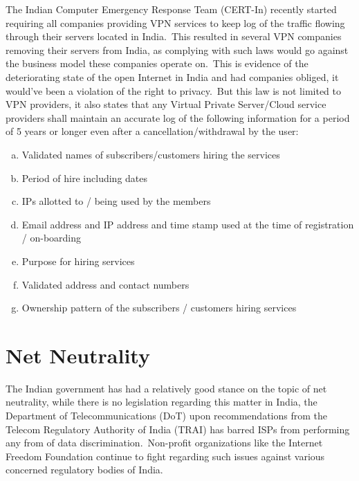 \documentclass[11pt,a4paper,oneside]{scrarticle}
\begin{document}
    The Indian Computer Emergency Response Team (CERT-In) recently started requiring all companies providing VPN
    services to keep log of the traffic flowing through their servers located in India.\ This resulted in several VPN
    companies removing their servers from India, as complying with such laws would go against the business model these
    companies operate on.\ This is evidence of the deteriorating state of the open Internet in India and had companies
    obliged, it would've been a violation of the right to privacy.\ But this law is not limited to VPN providers, it
    also states that any Virtual Private Server/Cloud service providers shall maintain an accurate log of the following
    information for a period of 5 years or longer even after a cancellation/withdrawal by the user:

    \begin{enumerate}[(a)]
        \singlespacing
        \item Validated names of subscribers/customers hiring the services
        \item Period of hire including dates
        \item IPs allotted to / being used by the members
        \item Email address and IP address and time stamp used at the time of registration / on-boarding
        \item Purpose for hiring services
        \item Validated address and contact numbers
        \item Ownership pattern of the subscribers / customers hiring services
    \end{enumerate}




    \section{Net Neutrality}\label{sec:net-neutrality}

    The Indian government has had a relatively good stance on the topic of net neutrality, while there is no legislation
    regarding this matter in India, the Department of Telecommunications (DoT) upon recommendations from the Telecom
    Regulatory Authority of India (TRAI) has barred ISPs from performing any from of data discrimination.\ Non-profit
    organizations like the Internet Freedom Foundation continue to fight regarding such issues against various concerned
    regulatory bodies of India.
\end{document}
